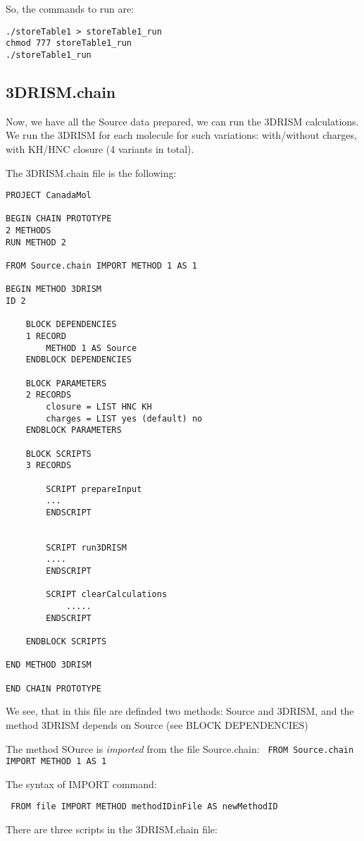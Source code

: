 \documentclass[12pt]{article}
\begin{document}
So, the commands to run are:

\begin{verbatim}
./storeTable1 > storeTable1_run
chmod 777 storeTable1_run
./storeTable1_run
\end{verbatim}

\subsection{3DRISM.chain}

Now, we have all the Source data prepared, we can run the 3DRISM calculations.
We run the 3DRISM for each molecule for such variations: 
with/without charges, with KH/HNC closure (4 variants in total).

The 3DRISM.chain file is the following:
\begin{verbatim}
PROJECT CanadaMol

BEGIN CHAIN PROTOTYPE
2 METHODS
RUN METHOD 2

FROM Source.chain IMPORT METHOD 1 AS 1

BEGIN METHOD 3DRISM
ID 2

	BLOCK DEPENDENCIES
	1 RECORD
		METHOD 1 AS Source
	ENDBLOCK DEPENDENCIES

	BLOCK PARAMETERS
	2 RECORDS
		closure = LIST HNC KH
		charges = LIST yes (default) no
	ENDBLOCK PARAMETERS

	BLOCK SCRIPTS
	3 RECORDS

		SCRIPT prepareInput
		...
		ENDSCRIPT 


		SCRIPT run3DRISM
		....
		ENDSCRIPT

		SCRIPT clearCalculations
			.....
		ENDSCRIPT

	ENDBLOCK SCRIPTS

END METHOD 3DRISM

END CHAIN PROTOTYPE

\end{verbatim}

We see, that in this file are definded two methods: Source and 3DRISM, and the method 3DRISM depends on Source (see BLOCK DEPENDENCIES)

The method SOurce is \emph{imported} from the file Source.chain:
\verb# FROM Source.chain IMPORT METHOD 1 AS 1 #
 
The syntax of IMPORT command:

\verb# FROM file IMPORT METHOD methodIDinFile AS newMethodID #


There are three scripts in the 3DRISM.chain file:
\end{document}
